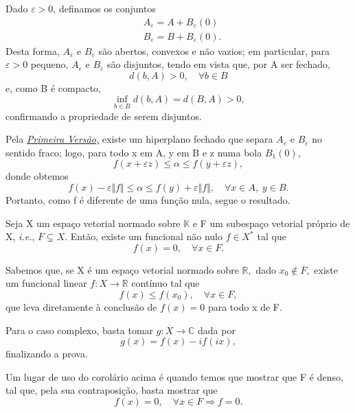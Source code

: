 \documentclass[../functional_analysis.tex]{subfiles}
\begin{document}
\begin{proof*}
	Dado \(\varepsilon > 0\), definamos os conjuntos
	\begin{align*}
		 & A_\varepsilon = A + B_\varepsilon(0)   \\
		 & B_\varepsilon = B + B_\varepsilon (0).
	\end{align*}
	Desta forma, \(A_\varepsilon \) e \(B_\varepsilon \) são abertos, convexos e não vazios; em particular, para \(\varepsilon > 0\) pequeno, \(A_\varepsilon \) e \(B_\varepsilon \) são disjuntos, tendo em vista que, por A ser fechado,
	\[
		d(b, A) > 0, \quad \forall b\in B
	\]
	e, como B é compacto,
	\[
		\inf_{b\in B}d(b, A) = d(B, A) > 0,
	\]
	confirmando a propriedade de serem disjuntos.

	Pela \hyperlink{first_geometric_hahn_banach}{\textit{Primeira Versão,}} existe um hiperplano fechado que separa \(A_\varepsilon \) e \(B_\varepsilon \) no sentido fraco; logo, para todo x em A, y em B e z numa bola \(B_1(0)\),
	\[
		f(x+\varepsilon z)\leq \alpha \leq f(y+\varepsilon z),
	\]
	donde obtemos
	\[
		f(x)-\varepsilon \Vert f \Vert\leq \alpha \leq f(y)+\varepsilon \Vert f \Vert,\quad \forall x\in A,\; y\in B.
	\]
	Portanto, como f é diferente de uma função nula, segue o resultado. \qedsymbol
\end{proof*}
\begin{crl*}
	Seja X um espaço vetorial normado sobre \(\mathbb{K}\) e F um subespaço vetorial próprio de X, \textit{i.e.}, \(\overline{F}\subsetneq X \). Então, existe um funcional não nulo \(f\in X^{*}\) tal que
	\[
		f(x) = 0, \quad \forall x\in F.
	\]
\end{crl*}
\begin{proof*}
	Sabemos que, se X é um espaço vetorial normado sobre \(\mathbb{R},\) dado \(x_{0}\not\in \overline{F},\) existe um funcional linear \(f:X\rightarrow \mathbb{R}\) contínuo tal que
	\[
		f(x)\leq f(x_{0}),\quad \forall x\in F,
	\]
	que leva diretamente à conclusão de \(f(x) = 0\) para todo x de F.

	Para o caso complexo, basta tomar \(g:X\rightarrow \mathbb{C}\) dada por
	\[
		g(x) = f(x)-if(ix),
	\]
	finalizando a prova. \qedsymbol
\end{proof*}
\begin{tcolorbox}[
		skin=enhanced,
		title=Observação,
		fonttitle=\bfseries,
		colframe=black,
		colbacktitle=cyan!75!white,
		colback=cyan!15,
		colbacklower=black,
		coltitle=black,
		drop fuzzy shadow,
	]
	Um lugar de uso do corolário acima é quando temos que mostrar que F é denso, tal que, pela sua contraposição, basta mostrar que
	\[
		f(x) = 0,\quad \forall x\in F \Rightarrow f = 0.
	\]
\end{tcolorbox}
\end{document}

